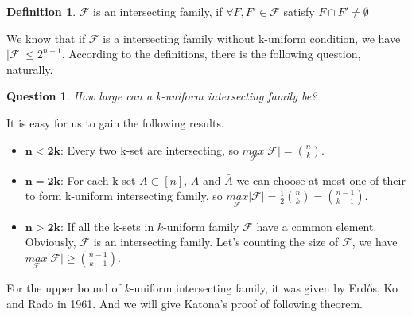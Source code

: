 \documentclass{article}
\newtheorem{question}[theorem]{Question}
\theoremstyle{definition}
\newtheorem{definition}[theorem]{Definition}
\def\Erdos{Erd\H{o}s}
\begin{document}
\begin{definition}
    $\mathcal{F}$ is an intersecting family, if $\forall F,F'\in \mathcal{F}$ satisfy $F\cap F' \ne \emptyset$
\end{definition}

We know that if $\mathcal{F}$ is a intersecting family without k-uniform condition, we have $|\mathcal{F}|\le 2^{n-1}$. According to the definitions, there is the following question, naturally. 

\begin{question}
How large can a k-uniform intersecting family be? 
\end{question}
It is easy for us to gain the following results.
\begin{itemize}
    \item $\mathbf{n<2k}$: Every two k-set are intersecting, so $\underset{\mathcal{F}}{max}|\mathcal{F}|=\binom{n}{k}$. 
    \item $\mathbf{n=2k}$: For each k-set $A\subset [n]$, $A$ and $\bar A$ we can choose at most one of their to form k-uniform intersecting family, so $\underset{\mathcal{F}}{max}|\mathcal{F}|=\frac{1}{2}\binom{n}{k}=\binom{n-1}{k-1}$.
    \item $\mathbf{n>2k}$: If all the k-sets in $k$-uniform family $\mathcal{F}$ have a common element. Obviously, $\mathcal{F}$ is an intersecting family. Let's counting the size of $\mathcal{F}$, we have $\underset{\mathcal{F}}{max}|\mathcal{F}|\ge \binom{n-1}{k-1}$.
\end{itemize}
For the upper bound of $k$-uniform intersecting family, it was given by \Erdos{}, Ko and Rado\cite{erdos1961intersection} in 1961. And we will give Katona's proof\cite{katona1964intersection} of following theorem. 
\end{document}
